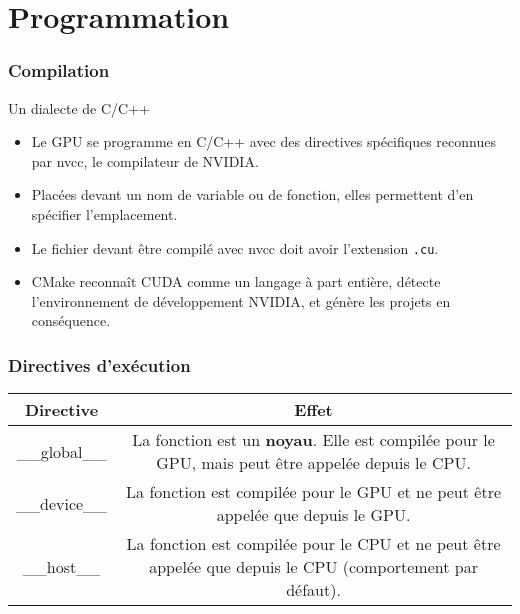 \section{Programmation}
\begin{frame}
    \frametitle{Compilation}
\begin{block}{Un dialecte de C/C++}
    \begin{itemize}
        \item<+-> Le GPU se programme en C/C++ avec des directives spécifiques reconnues par nvcc, le 
        compilateur de NVIDIA.
        \item<+-> Placées devant un nom de variable ou de fonction, elles permettent d'en spécifier l'emplacement.
        \item<+-> Le fichier devant être compilé avec nvcc doit avoir l'extension \texttt{.cu}.
        \item<+-> CMake reconnaît CUDA comme un langage à part entière, détecte l'environnement de développement NVIDIA, et génère les projets en conséquence.
    \end{itemize}
\end{block}
\end{frame}
\begin{frame}
    \frametitle{Directives d'exécution}
    \renewcommand{\arraystretch}{2}
    \vskip 20pt
    \begin{tabular}{|c|c|}
        \hline
        \rowcolor{lightgray} Directive & Effet \\ \hline
        \_\_global\_\_ & \begin{minipage}{0.8\textwidth}
            La fonction est un {\bf noyau}. Elle est compilée pour le GPU, mais peut être appelée depuis le CPU. 
        \end{minipage} \\ \hline
        \_\_device\_\_ & \begin{minipage}{0.8\textwidth}
            La fonction est compilée pour le GPU et ne peut être appelée que depuis le GPU. 
        \end{minipage} \\ \hline
        \_\_host\_\_ & \begin{minipage}{0.8\textwidth}
            La fonction est compilée pour le CPU et ne peut être appelée que depuis le CPU (comportement par défaut). 
        \end{minipage} \\ \hline
    \end{tabular}

\end{frame}
